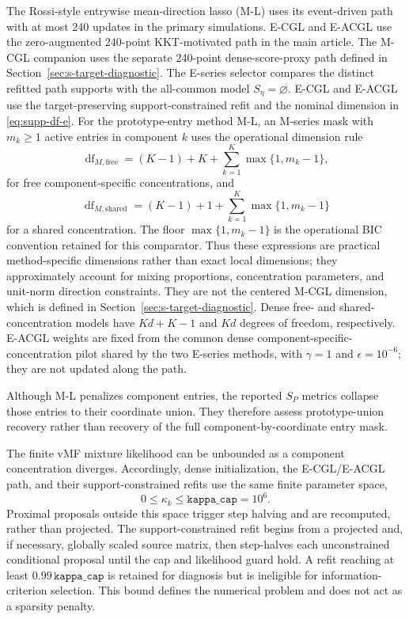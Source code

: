 \documentclass[preprint,12pt,authoryear]{elsarticle}
\begin{document}
The Rossi-style entrywise mean-direction lasso (M-L) uses its event-driven
path with at most 240 updates in the
primary simulations. E-CGL and E-ACGL use the zero-augmented 240-point
KKT-motivated path in the main article. The M-CGL companion uses the separate
240-point dense-score-proxy path defined in
Section~\ref{sec:s-target-diagnostic}. The E-series selector compares the distinct
refitted path supports with the all-common model
$S_\eta=\varnothing$. E-CGL and E-ACGL use the target-preserving
support-constrained refit and the nominal dimension in
\eqref{eq:supp-df-e}.
For the prototype-entry method M-L, an M-series mask with
$m_k\geq1$ active entries in component $k$ uses the operational dimension rule
\[
\operatorname{df}_{M,\mathrm{free}}
=(K-1)+K+\sum_{k=1}^K\max\{1,m_k-1\},
\]
for free component-specific concentrations, and
\[
\operatorname{df}_{M,\mathrm{shared}}
=(K-1)+1+\sum_{k=1}^K\max\{1,m_k-1\}
\]
for a shared concentration. The floor $\max\{1,m_k-1\}$ is the operational
BIC convention retained for this comparator. Thus these expressions are
practical method-specific dimensions rather than exact local dimensions;
they approximately account for mixing proportions, concentration parameters,
and unit-norm direction constraints.
They are not the centered M-CGL dimension, which is defined in
Section~\ref{sec:s-target-diagnostic}. Dense free- and shared-concentration
models have $Kd+K-1$ and $Kd$ degrees of freedom, respectively. E-ACGL weights
are fixed from the common dense component-specific-concentration pilot shared
by the two E-series methods, with $\gamma=1$ and $\epsilon=10^{-6}$; they are
not updated along the path.

Although M-L penalizes component entries, the reported $S_P$ metrics collapse
those entries to their coordinate union. They therefore assess
prototype-union recovery rather than recovery of the full component-by-coordinate
entry mask.

The finite vMF mixture likelihood can be unbounded as a component
concentration diverges.
Accordingly, dense initialization, the E-CGL/E-ACGL path, and their
support-constrained refits use the same finite parameter space,
\[
0\leq\kappa_k\leq\texttt{kappa\_cap}=10^6.
\]
Proximal proposals outside this space trigger step halving and are recomputed,
rather than projected. The support-constrained refit begins from a projected
and, if necessary, globally scaled source matrix, then step-halves each
unconstrained conditional proposal until the cap and likelihood guard hold. A
refit reaching at least
$0.99\,\texttt{kappa\_cap}$ is retained for diagnosis but is ineligible for
information-criterion selection. This bound defines the numerical problem and
does not act as a sparsity penalty.
\end{document}
